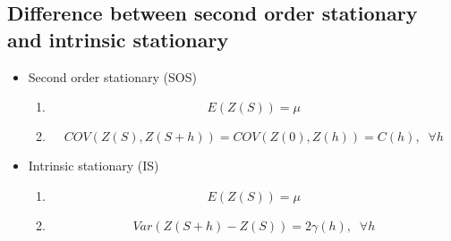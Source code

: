 \documentclass{article}\usepackage[]{graphicx}\usepackage[]{color}
\begin{document}
\begin{appendices}

\newpage

\section{Difference between second order stationary and intrinsic stationary}\label{sec:SOSIS}

\begin{itemize}
\item Second order stationary (SOS) 
\begin{enumerate}
\item \begin{equation}E(Z(S))=\mu\end{equation}
\item \begin{equation}COV(Z(S),Z(S+h))=COV(Z(0),Z(h))=C(h),\;\;\forall h\end{equation}
\end{enumerate}
\item Intrinsic stationary (IS)
\begin{enumerate}
\item \begin{equation}E(Z(S))=\mu\end{equation}
\item \begin{equation}Var(Z(S+h)-Z(S)) = 2\gamma(h),\;\;\forall h\end{equation}
\end{enumerate}
\end{itemize}


\end{appendices}
\end{document}
